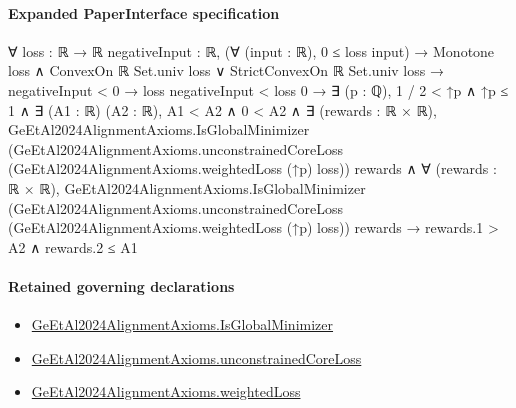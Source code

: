 \documentclass[10pt]{article}
\begin{document}
\paragraph{Expanded PaperInterface specification}
\begin{ReviewVerbatim}
∀ {loss : ℝ → ℝ} {negativeInput : ℝ},
  (∀ (input : ℝ), 0 ≤ loss input) →
    Monotone loss ∧ ConvexOn ℝ Set.univ loss ∨ StrictConvexOn ℝ Set.univ loss →
      negativeInput < 0 →
        loss negativeInput < loss 0 →
          ∃ (p : ℚ),
            1 / 2 < ↑p ∧
              ↑p ≤ 1 ∧
                ∃ (A1 : ℝ) (A2 : ℝ),
                  A1 < A2 ∧
                    0 < A2 ∧
                      ∃ (rewards : ℝ × ℝ),
                        GeEtAl2024AlignmentAxioms.IsGlobalMinimizer
                            (GeEtAl2024AlignmentAxioms.unconstrainedCoreLoss
                              (GeEtAl2024AlignmentAxioms.weightedLoss (↑p) loss))
                            rewards ∧
                          ∀ (rewards : ℝ × ℝ),
                            GeEtAl2024AlignmentAxioms.IsGlobalMinimizer
                                (GeEtAl2024AlignmentAxioms.unconstrainedCoreLoss
                                  (GeEtAl2024AlignmentAxioms.weightedLoss (↑p) loss))
                                rewards →
                              rewards.1 > A2 ∧ rewards.2 ≤ A1
\end{ReviewVerbatim}

\paragraph{Retained governing declarations}
\begin{itemize}\raggedright
\item \hyperlink{governing-declaration-b949f8b742cc6742}{Ge\allowbreak{}Et\allowbreak{}Al2024\allowbreak{}Alignment\allowbreak{}Axioms.\allowbreak{}Is\allowbreak{}Global\allowbreak{}Minimizer}
\item \hyperlink{governing-declaration-14e1ac9219427386}{Ge\allowbreak{}Et\allowbreak{}Al2024\allowbreak{}Alignment\allowbreak{}Axioms.\allowbreak{}unconstrained\allowbreak{}Core\allowbreak{}Loss}
\item \hyperlink{governing-declaration-f0a1abe56bab7307}{Ge\allowbreak{}Et\allowbreak{}Al2024\allowbreak{}Alignment\allowbreak{}Axioms.\allowbreak{}weighted\allowbreak{}Loss}
\end{itemize}
\end{document}
